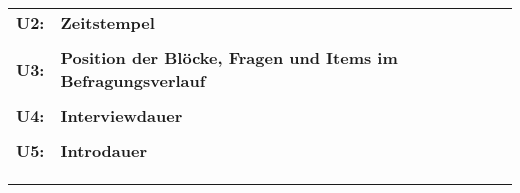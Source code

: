\begin{longtable}{!{\color{black}\vline width 1pt}  L{2cm}!{\color{black}\vline width 1pt} L{12.25cm}!{\color{black}\vline width 1pt}  L{2.5cm}!{\color{black}\vline width 1pt}}
   &  &  \\ 
   \midrule
\textbf{U2:}\label{U2} & \textbf{Zeitstempel} &  \\ 
   &  &  \\ 
   \midrule
\textbf{U3:}\label{U3} & \textbf{Position der Blöcke, Fragen und Items im Befragungsverlauf} &  \\ 
   &  &  \\ 
   \midrule
\textbf{U4:}\label{U4} & \textbf{Interviewdauer\label{Interviewdauer}} &  \\ 
   &  &  \\ 
   \midrule
\textbf{U5:}\label{U5} & \textbf{Introdauer} &  \\ 
   &  &  \\ 
   &  &  \\ 
   &  &  \\ 
  
\end{longtable}

